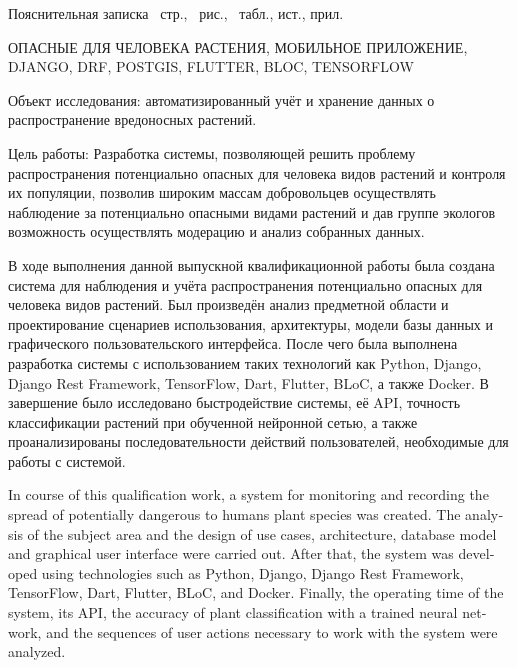 

\tab
Пояснительная записка \pagescount\ стр., \ рис., \ табл.,  ист.,  прил.

\tab
\MakeUppercase{Опасные для человека растения, Мобильное приложение, Django, DRF, PostGIS, Flutter, BLoC, TensorFlow}

\tab
Объект исследования: автоматизированный учёт и хранение данных о распространение вредоносных растений.

\tab
Цель работы: Разработка системы, позволяющей решить проблему распространения потенциально опасных для человека видов растений и контроля их популяции, позволив широким массам добровольцев осуществлять наблюдение за потенциально опасными видами растений и дав группе экологов возможность осуществлять модерацию и анализ собранных данных.

\tab
В ходе выполнения данной выпускной квалификационной работы была создана система для наблюдения и учёта распространения потенциально опасных для человека видов растений.
Был произведён анализ предметной области и проектирование сценариев использования, архитектуры, модели базы данных и графического пользовательского интерфейса.
После чего была выполнена разработка системы с использованием таких технологий как Python, Django, Django Rest Framework, TensorFlow, Dart, Flutter, BLoC, а также Docker.
В завершение было исследовано быстродействие системы, её API, точность классификации растений при обученной нейронной сетью, а также проанализированы последовательности действий пользователей, необходимые для работы с системой.

\cleardoublepage
{}

\tab
\begin{otherlanguage}{english}
	In course of this qualification work, a system for monitoring and recording the spread of potentially dangerous to humans plant species was created.
	The analysis of the subject area and the design of use cases, architecture, database model and graphical user interface were carried out.
	After that, the system was developed using technologies such as Python, Django, Django Rest Framework, TensorFlow, Dart, Flutter, BLoC, and Docker.
	Finally, the operating time of the system, its API, the accuracy of plant classification with a trained neural network, and the sequences of user actions necessary to work with the system were analyzed.
\end{otherlanguage}
